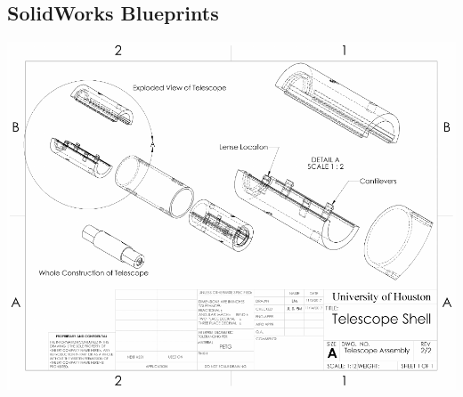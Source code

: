 \newpage
\onecolumngrid

\begin{appendices}
  \section{SolidWorks Blueprints}
    \includegraphics[width=\textwidth]{./Figures/blueprint.pdf}


\end{appendices}

